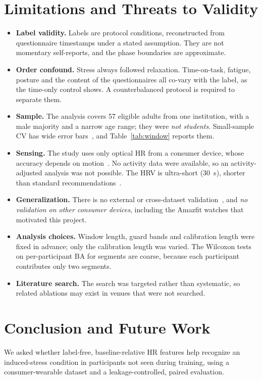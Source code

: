 \documentclass[conference]{IEEEtran}
\begin{document}
\section{Limitations and Threats to Validity}
\label{sec:limits}
\begin{itemize}
\item \textbf{Label validity.} Labels are protocol conditions, reconstructed from questionnaire timestamps under a stated assumption. They are not momentary self-reports, and the phase boundaries are approximate.
\item \textbf{Order confound.} Stress always followed relaxation. Time-on-task, fatigue, posture and the content of the questionnaires all co-vary with the label, as the time-only control shows. A counterbalanced protocol is required to separate them.
\item \textbf{Sample.} The analysis covers 57 eligible adults from one institution, with a male majority and a narrow age range; they were \emph{not students}. Small-sample CV has wide error bars~\cite{varoquaux2018cv}, and Table~\ref{tab:window} reports them.
\item \textbf{Sensing.} The study uses only optical HR from a consumer device, whose accuracy depends on motion~\cite{bent2020optical}. No activity data were available, so an activity-adjusted analysis was not possible. The HRV is ultra-short (30~s), shorter than standard recommendations~\cite{taskforce1996hrv}.
\item \textbf{Generalization.} There is no external or cross-dataset validation~\cite{mishra2020reproducibility}, and \emph{no validation on other consumer devices}, including the Amazfit watches that motivated this project.
\item \textbf{Analysis choices.} Window length, guard bands and calibration length were fixed in advance; only the calibration length was varied. The Wilcoxon tests on per-participant BA for segments are coarse, because each participant contributes only two segments.
\item \textbf{Literature search.} The search was targeted rather than systematic, so related ablations may exist in venues that were not searched.
\end{itemize}

\section{Conclusion and Future Work}
We asked whether label-free, baseline-relative HR features help recognize an induced-stress condition in participants not seen during training, using a consumer-wearable dataset and a leakage-controlled, paired evaluation.
\end{document}
